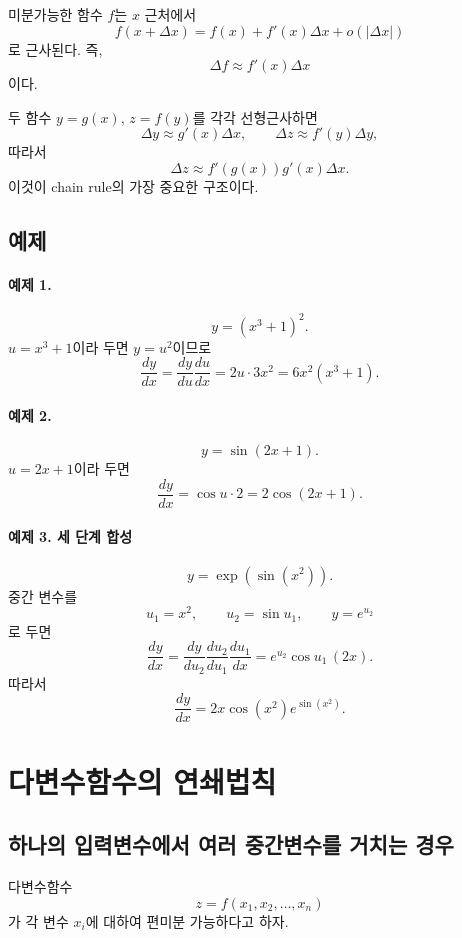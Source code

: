 \documentclass[11pt,a4paper]{article}
\begin{document}
미분가능한 함수 $f$는 $x$ 근처에서
\[
f(x+\Delta x)
=
f(x)+f'(x)\Delta x+o(|\Delta x|)
\]
로 근사된다. 즉,
\[
\boxed{\Delta f\approx f'(x)\Delta x}
\]
이다.

두 함수 $y=g(x)$, $z=f(y)$를 각각 선형근사하면
\[
\Delta y\approx g'(x)\Delta x,
\qquad
\Delta z\approx f'(y)\Delta y,
\]
따라서
\[
\Delta z\approx f'(g(x))g'(x)\Delta x.
\]
이것이 chain rule의 가장 중요한 구조이다.

\subsection{예제}

\paragraph{예제 1.}
\[
y=(x^3+1)^2.
\]
$u=x^3+1$이라 두면 $y=u^2$이므로
\[
\frac{dy}{dx}
=
\frac{dy}{du}\frac{du}{dx}
=
2u\cdot 3x^2
=
6x^2(x^3+1).
\]

\paragraph{예제 2.}
\[
y=\sin(2x+1).
\]
$u=2x+1$이라 두면
\[
\frac{dy}{dx}
=
\cos u\cdot 2
=
2\cos(2x+1).
\]

\paragraph{예제 3. 세 단계 합성}
\[
y=\exp\!\left(\sin(x^2)\right).
\]
중간 변수를
\[
u_1=x^2,\qquad u_2=\sin u_1,\qquad y=e^{u_2}
\]
로 두면
\[
\frac{dy}{dx}
=
\frac{dy}{du_2}
\frac{du_2}{du_1}
\frac{du_1}{dx}
=
e^{u_2}\cos u_1\,(2x).
\]
따라서
\[
\boxed{
\frac{dy}{dx}
=2x\cos(x^2)e^{\sin(x^2)}
}.
\]


\section{다변수함수의 연쇄법칙}

\subsection{하나의 입력변수에서 여러 중간변수를 거치는 경우}

다변수함수
\[
z=f(x_1,x_2,\ldots,x_n)
\]
가 각 변수 $x_i$에 대하여 편미분 가능하다고 하자.
\end{document}
